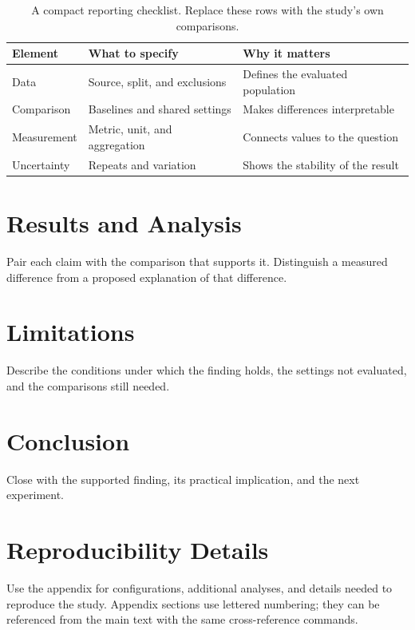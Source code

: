 \documentclass[10pt]{njulink}
\begin{document}
\begin{table}[htbp]
\caption{A compact reporting checklist. Replace these rows with the study's own comparisons.}
\label{tab:reporting}
\centering\small
\begin{tabularx}{\linewidth}{lYY}
\toprule
{}
\textbf{Element} & \textbf{What to specify} & \textbf{Why it matters} \\
\midrule
Data & Source, split, and exclusions & Defines the evaluated population \\
Comparison & Baselines and shared settings & Makes differences interpretable \\
Measurement & Metric, unit, and aggregation & Connects values to the question \\
Uncertainty & Repeats and variation & Shows the stability of the result \\
\bottomrule
\end{tabularx}
\end{table}

\section{Results and Analysis}
Pair each claim with the comparison that supports it. Distinguish a measured
difference from a proposed explanation of that difference.

\section{Limitations}
Describe the conditions under which the finding holds, the settings not
evaluated, and the comparisons still needed.

\section{Conclusion}
Close with the supported finding, its practical implication, and the next experiment.





\clearpage
\beginappendix
\section{Reproducibility Details}
\label{app:details}
Use the appendix for configurations, additional analyses, and details needed
to reproduce the study. Appendix sections use lettered numbering; they can be
referenced from the main text with the same cross-reference commands.
\end{document}
